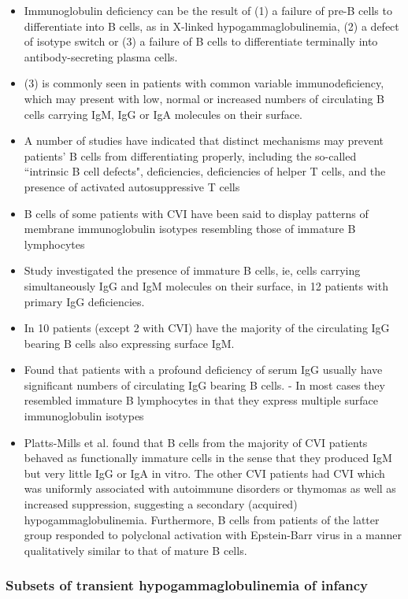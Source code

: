 \documentclass[12pt]{article}
\begin{document}
				\begin{itemize}
					\item Immunoglobulin deficiency can be the result of (1) a failure of pre-B cells to differentiate into B cells, as in X-linked hypogammaglobulinemia, (2) a defect of isotype switch or (3) a failure of B cells to differentiate terminally into antibody-secreting plasma cells.
					\item (3) is commonly seen in patients with common variable immunodeficiency, which may present with low, normal or increased numbers of circulating B cells carrying IgM, IgG or IgA molecules on their surface.
					\item A number of studies have indicated that distinct mechanisms may prevent patients' B cells from differentiating properly, including the so-called ``intrinsic B cell defects", deficiencies, deficiencies of helper T cells, and the presence of activated autosuppressive T cells
					\item B cells of some patients with CVI have been said to display patterns of membrane immunoglobulin isotypes resembling those of immature B lymphocytes
					\item Study investigated the presence of immature B cells, ie, cells carrying simultaneously IgG and IgM molecules on their surface, in 12 patients with primary IgG deficiencies. 
					\item In 10 patients (except 2 with CVI) have the majority of the circulating IgG bearing B cells also expressing surface IgM. 
					\item Found that patients with a profound deficiency of serum IgG usually have significant numbers of circulating IgG bearing B cells. - In most cases they resembled immature B lymphocytes in that they express multiple surface immunoglobulin isotypes
					\item Platts-Mills et al. found that B cells from the majority of CVI patients behaved as functionally immature cells in the sense that they produced IgM but very little IgG or IgA in vitro. The other CVI patients had CVI which was uniformly associated with autoimmune disorders or thymomas as well as increased suppression, suggesting a secondary (acquired) hypogammaglobulinemia. Furthermore, B cells from patients of the latter group responded to polyclonal activation with Epstein-Barr virus in a manner qualitatively similar to that of mature B cells. 
				\end{itemize}
			
			\subsubsection{Subsets of transient hypogammaglobulinemia of infancy \citeauthor{Dalal98} \citeyear{Dalal98}}
				
\end{document}
